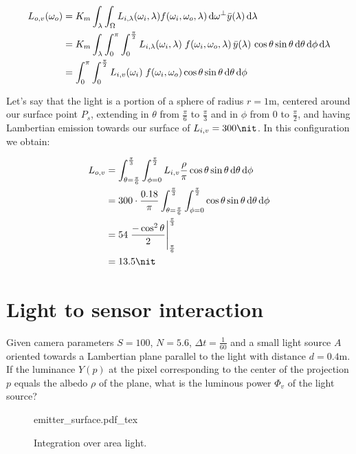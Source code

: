 \begin{displaymath}
\begin{split}
    L_{o,v}(\omega_o) &= K_m \int_\lambda \int_\Omega L_{i,\lambda}(\omega_i, \lambda) f(\omega_i, \omega_o, \lambda) \d \omega^{\bot} \bar y(\lambda) \d\lambda \\
    &= K_m \int_\lambda \int_0^\pi \int_0^{\frac \pi 2}  L_{i,\lambda}(\omega_i, \lambda)\;f(\omega_i, \omega_o, \lambda)\, \bar y(\lambda)\, \cos\theta \sin\theta \d\theta \d\phi \d\lambda \\
    &= \int_0^\pi \int_0^{\frac \pi 2}  L_{i,v}(\omega_i)\;f(\omega_i, \omega_o)\cos\theta \sin\theta \d\theta \d\phi
\end{split}
\end{displaymath}

Let's say that the light is a portion of a sphere of radius $r = \num{1}\unit{\meter}$, centered
around our surface point $P_s$, extending in $\theta$ from $\frac\pi6$ to $\frac\pi3$ and in
$\phi$ from $0$ to $\frac\pi2$, and having Lambertian emission towards our
surface of $L_{i,v} = \num{300}\unit{\nit}$.
In this configuration we obtain:

\begin{align*}
L_{o,v} &= \int_{\theta = \frac\pi 6}^\frac\pi 3 \int _{\phi = 0}^\frac\pi
2 L_{i,v} \frac\rho\pi \cos\theta \sin\theta \d\theta \d\phi \\
             &= 300\cdot \frac{0.18}\pi \int_{\theta = \frac\pi 6}^\frac\pi 3 \int _{\phi = 0}^\frac\pi 2 \cos\theta \sin\theta \d\theta \d\phi \\
             &= 54 \left.\frac{-\cos^2\theta}{2}\right|_{\frac\pi 6}^\frac\pi 3 \\
             &= \num{13.5}\unit{\nit}
\end{align*}

\section{Light to sensor interaction}

Given camera parameters $S=100$, $N=5.6$, $\Delta t = \frac 1 {60}$
and a small light source $A$ oriented towards a
Lambertian plane parallel to the light with distance
$d = \num{0.4}\unit{\meter}$. If the luminance $Y(p)$ at the pixel corresponding
to the center of the projection $p$ equals the albedo $\rho$ of the plane,
what is the luminous power $\Phi_v$ of the light source?
\begin{figure}[t]
    \centering
    \def\svgwidth{0.9\linewidth}
    {emitter_surface.pdf_tex}
    \caption{Integration over area light.}
\end{figure}

